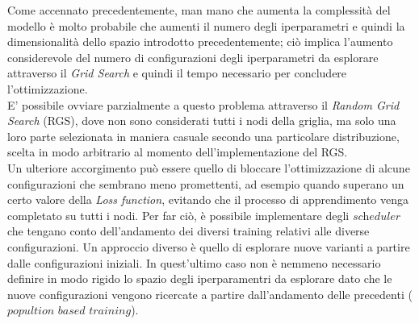 Come accennato precedentemente, man mano che aumenta la complessità del modello è molto probabile che aumenti il numero degli iperparametri e quindi la dimensionalità dello spazio introdotto precedentemente; ciò implica l'aumento considerevole del numero di configurazioni degli iperparametri da esplorare attraverso il \textit{Grid Search} e quindi il tempo necessario per concludere l'ottimizzazione.\\
E' possibile ovviare parzialmente a questo problema attraverso il \textit{Random Grid Search} (RGS), dove non sono considerati tutti i nodi della griglia, ma solo una loro parte selezionata in maniera casuale secondo una particolare distribuzione, scelta in modo arbitrario al momento dell'implementazione del RGS. \\
Un ulteriore accorgimento può  essere quello di bloccare l'ottimizzazione di alcune configurazioni che sembrano meno promettenti, ad esempio quando superano un certo valore della \textit{Loss function}, evitando che il processo di apprendimento venga completato su tutti i nodi. Per far ciò, è possibile implementare degli $\textit{scheduler}$ che tengano conto dell'andamento dei diversi training relativi alle diverse configurazioni. Un approccio diverso è quello di esplorare nuove varianti a partire dalle configurazioni iniziali. In quest'ultimo caso non è nemmeno necessario definire in modo rigido lo spazio degli iperparamentri da esplorare dato che le nuove configurazioni vengono ricercate a partire dall'andamento delle precedenti ($\textit{popultion based training}$).

\newpage


